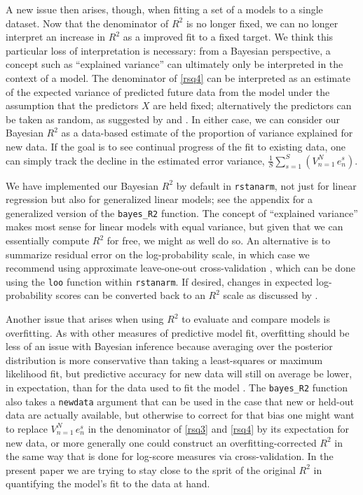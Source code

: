 \documentclass[11pt]{article}
\begin{document}
A new issue then arises, though, when fitting a set of a models to a single
dataset.  Now that the denominator of $R^2$ is no longer fixed, we can no longer
interpret an increase in $R^2$ as a improved fit to a fixed target.  We think
this particular loss of interpretation is necessary:  from a Bayesian
perspective, a concept such as ``explained variance'' can ultimately only be
interpreted in the context of a model.  The denominator of \eqref{rsq4} can be
interpreted as an estimate of the expected variance of predicted future data
from the model under the assumption that the predictors $X$ are held fixed;
alternatively the predictors can be taken as random, as suggested by
\cite{Helland1987} and \cite{Tjur2009}.  In either case, we can consider our
Bayesian $R^2$ as a data-based estimate of the proportion of variance explained
for new data. If the goal is to see continual progress of the fit to existing
data, one can simply track the decline in the estimated error variance,
$\frac{1}{S}\sum_{s=1}^S \left(V_{n=1}^N \,e_n^s\right)$.

We have implemented our Bayesian $R^2$ by default in
{\tt rstanarm}, not just for linear regression but also for generalized linear
models; see the appendix for a generalized version of the
\verb#bayes_R2# function. The concept of ``explained variance'' makes most
sense for linear models with equal variance, but given that we can essentially
compute $R^2$ for free, we might as well do so.  An alternative is to summarize
residual error on the log-probability scale, in which case we recommend using
approximate leave-one-out cross-validation \citep{VehtariGelmanGabry2017},
which can be done using the {\tt loo} function within {\tt rstanarm}.
If desired, changes in expected log-probability scores can be converted back to
an $R^2$ scale as discussed by \cite{Nagelkerke1991}.

Another issue that arises when using $R^2$ to evaluate and compare models is
overfitting.  As with other measures of predictive model fit, overfitting should
be less of an issue with Bayesian inference because averaging over the posterior
distribution is more conservative than taking a least-squares or maximum
likelihood fit, but predictive accuracy for new data will still on average be
lower, in expectation, than for the data used to fit the model
\citep{GelmanHwangVehtari2014}. The \verb#bayes_R2# function
also takes a  {\tt newdata} argument that can be used in the case that new or held-out data
are actually available, but otherwise to correct for that bias one might want to
replace $V_{n=1}^N \,e_n^s$ in the denominator of \eqref{rsq3} and \eqref{rsq4} by its expectation
for new data, or more generally one could construct an overfitting-corrected
$R^2$ in the same way that is done for log-score measures via cross-validation.
In the present paper we are trying to stay close to the sprit of the original
$R^2$ in quantifying the model's fit to the data at hand.
\end{document}
